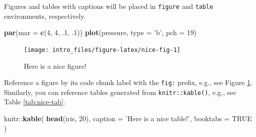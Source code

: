 \documentclass[]{book}
\newenvironment{Shaded}{\begin{snugshade}}{\end{snugshade}}
\newcommand{\KeywordTok}[1]{\textcolor[rgb]{0.13,0.29,0.53}{\textbf{{#1}}}}
\newcommand{\DataTypeTok}[1]{\textcolor[rgb]{0.13,0.29,0.53}{{#1}}}
\newcommand{\DecValTok}[1]{\textcolor[rgb]{0.00,0.00,0.81}{{#1}}}
\newcommand{\StringTok}[1]{\textcolor[rgb]{0.31,0.60,0.02}{{#1}}}
\newcommand{\OtherTok}[1]{\textcolor[rgb]{0.56,0.35,0.01}{{#1}}}
\newcommand{\NormalTok}[1]{{#1}}
\theoremstyle{definition}
\theoremstyle{definition}
\theoremstyle{definition}
\theoremstyle{remark}
\begin{document}
Figures and tables with captions will be placed in \texttt{figure} and
\texttt{table} environments, respectively.

\begin{Shaded}
\begin{Highlighting}[]
\KeywordTok{par}\NormalTok{(}\DataTypeTok{mar =} \KeywordTok{c}\NormalTok{(}\DecValTok{4}\NormalTok{, }\DecValTok{4}\NormalTok{, .}\DecValTok{1}\NormalTok{, .}\DecValTok{1}\NormalTok{))}
\KeywordTok{plot}\NormalTok{(pressure, }\DataTypeTok{type =} \StringTok{'b'}\NormalTok{, }\DataTypeTok{pch =} \DecValTok{19}\NormalTok{)}
\end{Highlighting}
\end{Shaded}

\begin{figure}

{\centering \texttt{[image: intro\_files/figure-latex/nice-fig-1]} 

}

\caption{Here is a nice figure!}\label{fig:nice-fig}
\end{figure}

Reference a figure by its code chunk label with the \texttt{fig:}
prefix, e.g., see Figure \ref{fig:nice-fig}. Similarly, you can
reference tables generated from \texttt{knitr::kable()}, e.g., see Table
\ref{tab:nice-tab}.

\begin{Shaded}
\begin{Highlighting}[]
\NormalTok{knitr::}\KeywordTok{kable}\NormalTok{(}
  \KeywordTok{head}\NormalTok{(iris, }\DecValTok{20}\NormalTok{), }\DataTypeTok{caption =} \StringTok{'Here is a nice table!'}\NormalTok{,}
  \DataTypeTok{booktabs =} \OtherTok{TRUE}
\NormalTok{)}
\end{Highlighting}
\end{Shaded}
\end{document}
